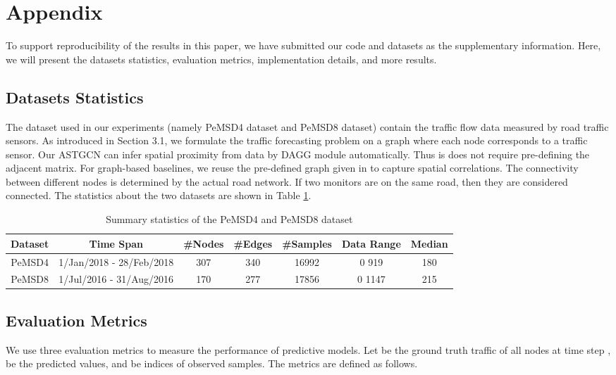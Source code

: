 \documentclass{article}
\begin{document}
 


\newpage
\appendix
\section{Appendix}
To support reproducibility of the results in this paper, we have submitted our code and datasets as the supplementary information. Here, we will present the datasets statistics, evaluation metrics, implementation details, and more results.
\subsection{Datasets Statistics}
The dataset used in our experiments (namely PeMSD4 dataset and PeMSD8 dataset) contain the traffic flow data measured by road traffic sensors. As introduced in Section 3.1, we formulate the traffic forecasting problem on a graph where each node corresponds to a traffic sensor. 
Our ASTGCN can infer spatial proximity from data by DAGG module automatically. Thus is does not require pre-defining the adjacent matrix. For graph-based baselines, we reuse the pre-defined graph given in \cite{stsgcn-aaai2020} to capture spatial correlations. The connectivity between different nodes is determined by the actual road network. If two monitors are on the same road, then they are considered connected. The statistics about the two datasets are shown in Table \ref{dataset}.
\begin{table}[h]
\centering
\caption{Summary statistics of the PeMSD4 and PeMSD8 dataset}
\label{dataset}
\begin{tabular}{@{}ccccccc@{}}
\toprule
Dataset & Time Span                & \#Nodes & \#Edges & \#Samples & Data Range   & Median \\ \midrule
PeMSD4  & 1/Jan/2018 - 28/Feb/2018 & 307     & 340     & 16992     & 0 919  & 180    \\ \midrule
PeMSD8  & 1/Jul/2016 - 31/Aug/2016 & 170     & 277     & 17856     & 0 1147 & 215    \\ \bottomrule
\end{tabular}
\end{table}

\subsection{Evaluation Metrics}
We use three evaluation metrics to measure the performance of predictive models. Let  be the ground truth traffic of all nodes at time step ,  be the predicted values, and  be indices of observed samples. The metrics are defined as follows.
\end{document}
